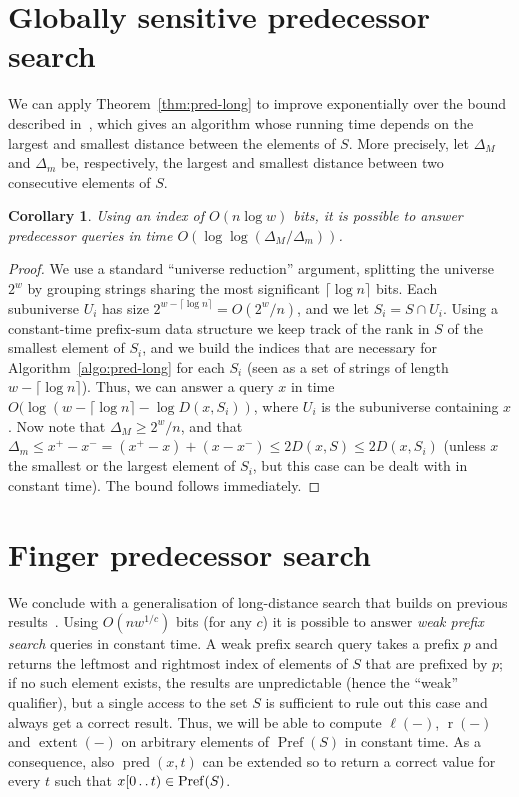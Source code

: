 \documentclass[a4paper,11pt]{article}
\newtheorem{corollary}[theorem]{Corollary}
\newcommand{\?}{\mskip1.5mu}
\def\..{\,\mathpunct{\ldotp\ldotp}} %
\DeclareMathOperator{\lrange}{\ell}
\DeclareMathOperator{\rrange}{r}
\DeclareMathOperator{\extent}{extent}
\DeclareMathOperator{\Pref}{Pref}
\DeclareMathOperator{\pred}{pred}
\begin{document}
\section{Globally sensitive predecessor search}

We can apply Theorem~\ref{thm:pred-long} to improve exponentially over the bound
described in~\cite{DemaineJoPa04}, which gives an algorithm whose running time
depends on the largest and smallest distance between the elements of $S$. 
More precisely, let
$\Delta_M$ and $\Delta_m$ be, respectively, the largest and smallest distance
between two consecutive elements of $S$.
\begin{corollary}
\label{cor:deltadelta}
Using an index of $O(n\log w)$ bits, it is possible to answer predecessor
queries in time $O(\log\log(\Delta_M/\Delta_m))$.
\end{corollary}
\begin{proof}
We use a standard ``universe reduction'' argument, splitting 
the universe $2^w$ by grouping strings sharing the most significant $\lceil \log
n\rceil$ bits. Each subuniverse $U_i$ has size $2^{w-\lceil \log
n\rceil}=O(2^w/n)$, and we let $S_i=S\cap U_i$. Using a constant-time
prefix-sum data structure we keep track of the rank in $S$ of the smallest
element of $S_i$, and we build the indices that are necessary for
Algorithm~\ref{algo:pred-long} for each $S_i$ (seen as a set of strings of
length $w-\lceil \log
n\rceil$). Thus, we can answer a query $x$ in time $O(\log(w-\lceil \log
n\rceil -\log D(x,S_i))$, where $U_i$ is the subuniverse containing $x$. Now
note that $\Delta_M\geq 2^w/n$, and that $\Delta_m\leq x^+-x^-
=(x^+-x)+(x-x^-)\leq 2D(x,S)\leq 2D(x,S_i)$ (unless $x$ the smallest or the
largest element of $S_i$, but this case can be dealt with in constant time). The
bound follows immediately.
\end{proof}

\section{Finger predecessor search}

We conclude with a generalisation of long-distance search that builds on previous results~\cite{BelazzouguiBoPaVi11b}.
Using $O(n w^{1/c})$ bits (for any $c$) it
is possible to answer \emph{weak prefix search} queries in constant time. A weak
prefix search query takes a prefix $p$ and returns the leftmost and rightmost
index of elements of $S$ that are prefixed by $p$; if no such element exists,
the results are unpredictable (hence the ``weak'' qualifier), but a single access to the set $S$ is sufficient
to rule out this case and always get a correct result. Thus, we will be
able to compute $\lrange(-)$, $\rrange(-)$ and $\extent(-)$ on arbitrary
elements of $\Pref(S)$ in constant time. As a consequence, also $\pred(x,t)$ can
be extended so to return a correct value for every $t$ such that
$x[0\..t)\in \Pref(S)$.
\end{document}
